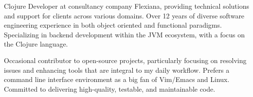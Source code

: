 

\begin{cvparagraph}

Clojure Developer at consultancy company Flexiana, providing technical solutions and support for clients across various domains. Over 12 years of diverse software engineering experience in both object oriented and functional paradigms. Specializing in backend development within the JVM ecosystem, with a focus on the Clojure language.

Occasional contributor to open-source projects, particularly focusing on resolving issues and enhancing tools that are integral to my daily workflow. Prefers a command line interface environment as a big fan of Vim/Emacs and Linux. Committed to delivering high-quality, testable, and maintainable code.
\end{cvparagraph}
